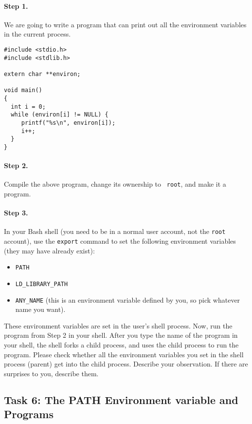 \paragraph{Step 1.} We are going to write a program that can print out all
the environment variables in the current process.

\begin{Verbatim}[frame=single]
#include <stdio.h>
#include <stdlib.h>

extern char **environ;

void main()
{
  int i = 0;
  while (environ[i] != NULL) {
     printf("%s\n", environ[i]);
     i++;
  }
}
\end{Verbatim}


\paragraph{Step 2.} Compile the above program, change its ownership to {\tt
root}, and make it a \setuid program. 


\paragraph{Step 3.} In your Bash shell (you need to be in a normal user account,
not the {\tt root} account), use the {\tt export} command to set the
following environment variables (they may have already exist):
\begin{itemize}
\item {\tt PATH}
\item {\tt LD\_LIBRARY\_PATH}
\item {\tt ANY\_NAME} (this is an environment variable defined by you, so
pick whatever name you want).
\end{itemize}

These environment variables are set in the user's shell process.
Now, run the \setuid program from Step 2 in your shell. After you type the
name of the program in your shell, the shell forks a child process,
and uses the child process to run the program. Please check whether all the
environment variables you set in the shell process (parent) get into
the \setuid child process.  Describe your observation. If there are 
surprises to you, describe them.  



\subsection{Task 6: The PATH Environment variable and \setuid Programs}

